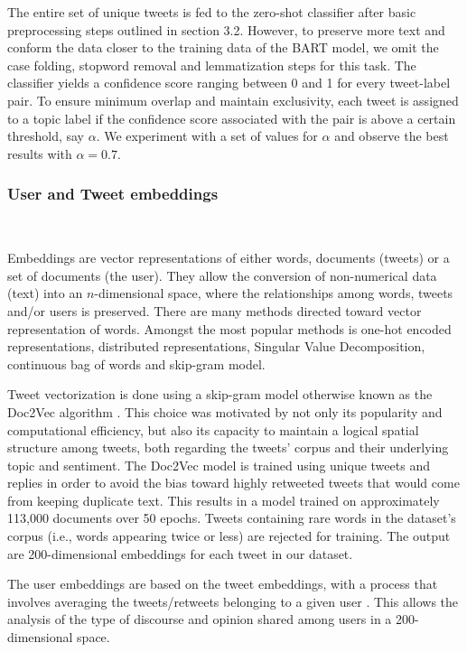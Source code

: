 \documentclass{article}
\begin{document}
The entire set of unique tweets is fed to the zero-shot classifier after basic preprocessing steps
outlined in section 3.2. However, to preserve more text and conform the data closer to the training
data of the BART model, we omit the case folding, stopword removal and lemmatization steps for this
task. The classifier yields a confidence score ranging between 0 and 1 for every tweet-label pair.
To ensure minimum overlap and maintain exclusivity, each tweet is assigned to a topic label if the
confidence score associated with the pair is above a certain threshold, say $\alpha$. We experiment
with a set of values for $\alpha$ and observe the best results with $\alpha = 0.7$.

\subsubsection{User and Tweet embeddings}~\label{sec:embeddings}

Embeddings are vector representations of either words, documents (tweets) or a set of documents (the
user). They allow the conversion of non-numerical data (text) into an $n$-dimensional space, where
the relationships among words, tweets and/or users is preserved. There are many methods directed
toward vector representation of words. Amongst the most popular methods is one-hot encoded
representations, distributed representations, Singular Value Decomposition, continuous bag of words
and skip-gram model.

Tweet vectorization is done using a skip-gram model otherwise known as the Doc2Vec algorithm
\cite{Le2014}. This choice was motivated by not only its popularity and computational efficiency,
but also its capacity to maintain a logical spatial structure among tweets, both regarding the
tweets' corpus and their underlying topic and sentiment. The Doc2Vec model is trained using unique
tweets and replies in order to avoid the bias toward highly retweeted tweets that would come from
keeping duplicate text. This results in a model trained on approximately 113,000 documents over 50
epochs. Tweets containing rare words in the dataset's corpus (i.e., words appearing twice or less)
are rejected for training. The output are 200-dimensional embeddings for each tweet in our dataset.

The user embeddings are based on the tweet embeddings, with a process that involves averaging the
tweets/retweets belonging to a given user \cite{Hallac2019}. This allows the analysis of the type of
discourse and opinion shared among users in a 200-dimensional space.
\end{document}
